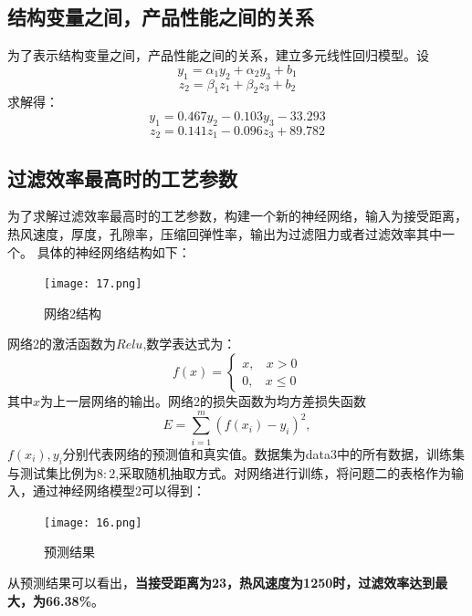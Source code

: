\documentclass[withoutpreface,bwprint]{cumcmthesis} %
\begin{document}
\subsection{结构变量之间，产品性能之间的关系}
为了表示结构变量之间，产品性能之间的关系，建立多元线性回归模型。设
$$y_1=\alpha_1 y_2 + \alpha_2 y_3+b_1$$
$$z_2=\beta_1 z_1 + \beta_2 z_3+b_2$$
求解得：
$$y_1=0.467 y_2 -0.103 y_3-33.293$$
$$z_2=0.141 z_1 -0.096 z_3+89.782$$

\subsection{过滤效率最高时的工艺参数}
为了求解过滤效率最高时的工艺参数，构建一个新的神经网络，输入为接受距离，热风速度，厚度，孔隙率，压缩回弹性率，输出为过滤阻力或者过滤效率其中一个。
具体的神经网络结构如下：
	\begin{figure}[H]
		\centering
		\texttt{[image: 17.png]}	
		\caption{网络2结构}
		\label{17}
	\end{figure}
	网络2的激活函数为$Relu$,数学表达式为：
	$$	f(x)=\left\{\begin{array}{c}
	x ,~~~~x>0 \\
	0, ~~~~x \leq 0
	\end{array}\right.
	$$
其中$x$为上一层网络的输出。网络2的损失函数为均方差损失函数$$E= \sum_{i=1}^m(f(x_i)-y_i)^2,$$$f(x_i),y_i$分别代表网络的预测值和真实值。数据集为data3中的所有数据，训练集与测试集比例为$8:2$,采取随机抽取方式。对网络进行训练，将问题二的表格作为输入，通过神经网络模型2可以得到：
	\begin{figure}[H]
	\centering
	\texttt{[image: 16.png]}	
	\caption{预测结果}
	\label{16}
\end{figure}
从预测结果可以看出，\textbf{当接受距离为23，热风速度为1250时，过滤效率达到最大，为66.38\%}。
	
	
\end{document}
